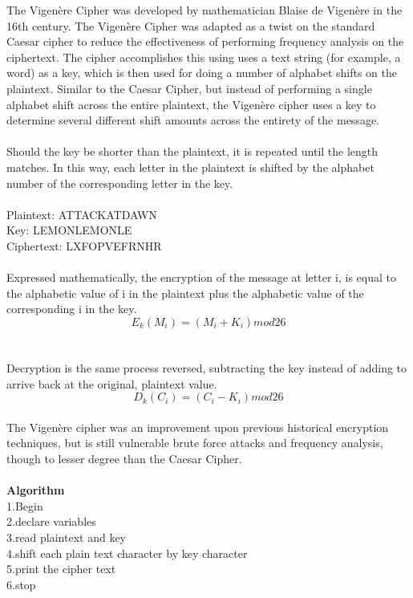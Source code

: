 \documentclass[11pt]{article}
\begin{document}
The Vigenère Cipher was developed by mathematician Blaise de Vigenère in the 16th century. The Vigenère Cipher was adapted as a twist on the standard Caesar cipher to reduce the effectiveness of performing frequency analysis on the ciphertext. The cipher accomplishes this using uses a text string (for example, a word) as a key, which is then used for doing a number of alphabet shifts on the plaintext. Similar to the Caesar Cipher, but instead of performing a single alphabet shift across the entire plaintext, the Vigenère cipher uses a key to determine several different shift amounts across the entirety of the message.
\\
\\
Should the key be shorter than the plaintext, it is repeated until the length matches. In this way, each letter in the plaintext is shifted by the alphabet number of the corresponding letter in the key.
\\
\\
Plaintext:  ATTACKATDAWN\\
Key:        LEMONLEMONLE\\
Ciphertext: LXFOPVEFRNHR
\\
\\
Expressed mathematically, the encryption of the message at letter i, is equal to the alphabetic value of i in the plaintext plus the alphabetic value of the corresponding i in the key.
$$E_k(M_i)=(M_i+K_i)mod26$$
\\
\\
Decryption is the same process reversed, subtracting the key instead of adding to arrive back at the original, plaintext value.
\\
$$D_k(C_i)=(C_i-K_i)mod26$$
\\
The Vigenère cipher was an improvement upon previous historical encryption techniques, but is still vulnerable brute force attacks and frequency analysis, though to lesser degree than the Caesar Cipher.
\\
\\
\textbf{Algorithm}
\\
1.Begin\\
2.declare variables\\
3.read plaintext and key\\
4.shift each plain text character by key character\\
5.print the cipher text\\
6.stop\\
\\
\\
\end{document}
